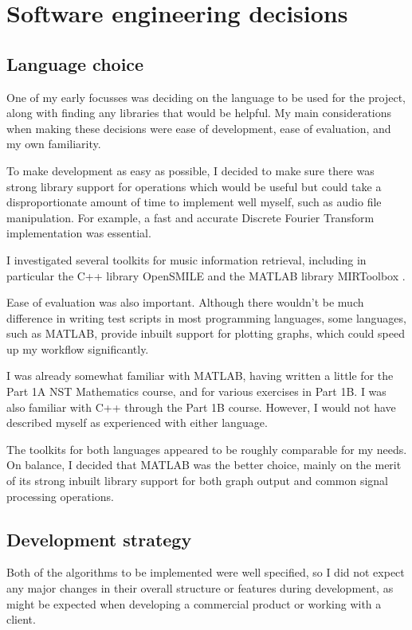 \documentclass[12pt,a4paper,twoside,openright]{report}
\begin{document}
\section{Software engineering decisions}

\subsection{Language choice}

One of my early focusses was deciding on the language to be used for the project, along with finding any libraries that would be helpful. My main considerations when making these decisions were ease of development, ease of evaluation, and my own familiarity.

To make development as easy as possible, I decided to make sure there was strong library support for operations which would be useful but could take a disproportionate amount of time to implement well myself, such as audio file manipulation. For example, a fast and accurate Discrete Fourier Transform implementation was essential.

I investigated several toolkits for music information retrieval, including in particular the C++ library OpenSMILE \cite{Eyben10} and the MATLAB library MIRToolbox \cite{Lartillot07}.

Ease of evaluation was also important. Although there wouldn't be much difference in writing test scripts in most programming languages, some languages, such as MATLAB, provide inbuilt support for plotting graphs, which could speed up my workflow significantly.

I was already somewhat familiar with MATLAB, having written a little for the Part 1A NST Mathematics course, and for various exercises in Part 1B. I was also familiar with C++ through the Part 1B course. However, I would not have described myself as experienced with either language.

The toolkits for both languages appeared to be roughly comparable for my needs. On balance, I decided that MATLAB was the better choice, mainly on the merit of its strong inbuilt library support for both graph output and common signal processing operations.


\subsection{Development strategy}
\label{section:devstrat}

Both of the algorithms to be implemented were well specified, so I did not expect any major changes in their overall structure or features during development, as might be expected when developing a commercial product or working with a client. 
\end{document}

